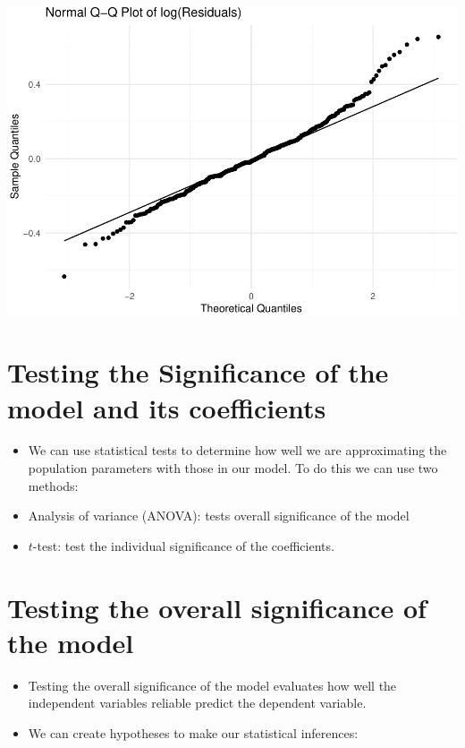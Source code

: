 \documentclass[
]{article}
\providecommand{\tightlist}{%
  \setlength{\itemsep}{0pt}\setlength{\parskip}{0pt}}
\begin{document}
\includegraphics{L9_Regression_model_fitting_pdf_files/figure-latex/unnamed-chunk-13-1.pdf}

\hypertarget{testing-the-significance-of-the-model-and-its-coefficients}{%
\section{Testing the Significance of the model and its
coefficients}\label{testing-the-significance-of-the-model-and-its-coefficients}}

\begin{itemize}
\item
  We can use statistical tests to determine how well we are
  approximating the population parameters with those in our model. To do
  this we can use two methods:
\item
  Analysis of variance (ANOVA): tests overall significance of the model
\item
  \(t\)-test: test the individual significance of the coefficients.
\end{itemize}

\hypertarget{testing-the-overall-significance-of-the-model}{%
\section{Testing the overall significance of the
model}\label{testing-the-overall-significance-of-the-model}}

\begin{itemize}
\tightlist
\item
  Testing the overall significance of the model evaluates how well the
  independent variables reliable predict the dependent variable.
\item
  We can create hypotheses to make our statistical inferences:
\end{itemize}
\end{document}
